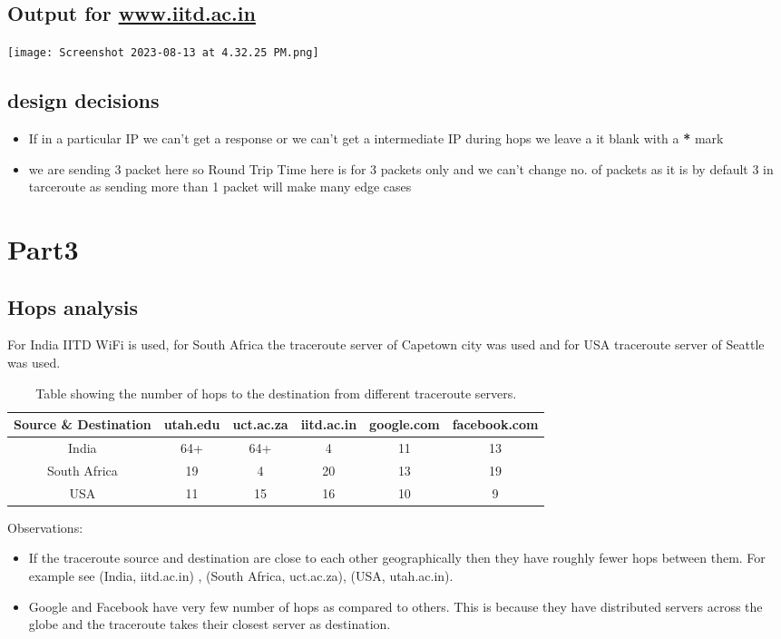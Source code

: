\documentclass[11pt]{scrartcl}
\begin{document}
\subsection{Output for \underline{www.iitd.ac.in}}
\texttt{[image: Screenshot 2023-08-13 at 4.32.25 PM.png]}

\subsection{design decisions}
\begin{itemize}
    \item If in a particular IP we can't get a response or we can't get a intermediate IP during hops we leave a it blank with a \textbf{*} mark
    \item  we are sending 3 packet here so Round Trip Time here is for 3 packets only and we can't change no. of packets as it is by default 3 in tarceroute as sending more than 1 packet will make many edge cases
\end{itemize}

\newpage
\section{ Part3 }
\subsection{Hops analysis}

For India IITD WiFi is used, for South Africa the traceroute server of Capetown city was used and for USA traceroute server of Seattle was used.
\begin{table}[ht]
\centering
\begin{tabular}{|c|c|c|c|c|c|}
\hline
Source \& Destination & utah.edu & uct.ac.za & iitd.ac.in & google.com & facebook.com \\
\hline
India & 64+ & 64+ & 4 & 11 & 13 \\
\hline
South Africa & 19 & 4 &  20 & 13 & 19\\
\hline
USA &  11 & 15 & 16 & 10 & 9\\
\hline
\end{tabular}
\caption{Table showing the number of hops to the destination from different traceroute servers.}
\label{tab:simple}
\end{table}

Observations:
\begin{itemize}
    \item If the traceroute source and destination are close to each other geographically then they have roughly fewer hops between them. For example see (India, iitd.ac.in) , (South Africa, uct.ac.za), (USA, utah.ac.in).
    \item Google and Facebook have very  few number of hops as compared to others. This is because they have distributed servers across the globe and the traceroute takes their closest server as destination.
\end{itemize}
\end{document}
